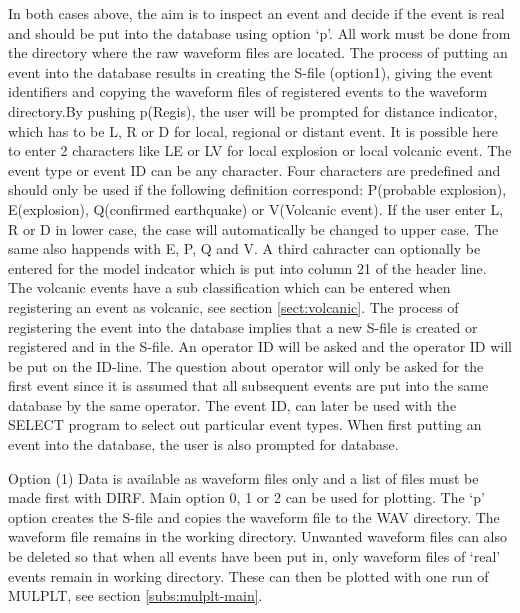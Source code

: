 In both cases above, the aim is to inspect an event and decide if the event is real and should be put into the database using option `p'. All work must be done from the directory where the raw waveform files are located. The process of putting an event into the database results in creating the S-file (option1), giving the event identifiers and copying the waveform files of registered events to the waveform directory.By pushing p(Regis), the user will be prompted for distance indicator, which has to be L, R or D for local, regional or distant event. It is possible here to enter 2 characters like LE or LV for local explosion or local volcanic event. The event type or event ID can be any character. Four characters are predefined and should only be used if the following definition correspond: P(probable explosion), E(explosion), Q(confirmed earthquake) or V(Volcanic event). If the user enter L, R or D in lower case, the case will automatically be changed to upper case. The same also happends with E, P, Q and V. A third cahracter can optionally be entered for the model indcator   which is put into column 21 of the header line. The volcanic events have a sub classification which can be entered when registering an event as volcanic, see section \ref{sect:volcanic}. The process of registering the event into the database implies that a new S-file is created or registered and in the S-file. An operator ID will be asked and the operator ID will be put on the ID-line. The question about operator will only be asked for the first event since it is assumed that all subsequent events are put into the same database by the same operator. The event ID, can later be used with the SELECT program to select out particular event types. When first putting an event into the database, the user is also prompted for database.  

Option (1) \newline
Data is available as waveform files only and a list of files must be 
made first with DIRF. Main option 0, 1 or 2 can be used for plotting. 
The `p' option creates the S-file and copies the waveform file to 
the WAV directory. The waveform file remains in the working directory. 
Unwanted waveform files can also be deleted so that when all events 
have been put in, only waveform files of `real' events remain in working 
directory. These can then be plotted with one run of MULPLT, see 
section \ref{subs:mulplt-main}.  

